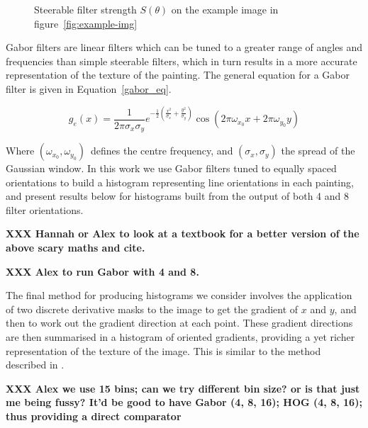 \documentclass[conference,a4paper]{IEEEtran}
\begin{document}
\begin{figure}[h]
\centering

\caption{Steerable filter strength $S(\theta)$ on the example image in figure~\ref{fig:example-img}}
\end{figure}

Gabor filters are linear filters which can be tuned to a greater range of
angles and frequencies than simple steerable filters, which in turn results in
a more accurate representation of the texture of the painting. The general
equation for a Gabor filter is given in Equation~\ref{gabor_eq}.

\begin{equation}
g_e(x) = \frac{1}{2\pi\sigma_x \sigma_y}e^{-\frac{1}{2}\left(\frac{x^2}{\sigma_x}+\frac{y^2}{\sigma_y}\right)}\cos(2\pi\omega_{x_0}x + 2\pi\omega_{y_0}y)
\label{gabor_eq}
\end{equation}

Where $(\omega_{x_0},\omega_{y_0})$\ defines the centre frequency, and
$(\sigma_x,\sigma_y)$ the spread of the Gaussian window. In this work we use
Gabor filters tuned to equally spaced orientations to build a histogram
representing line orientations in each painting, and present results below for
histograms built from the output of both 4 and 8 filter orientations.

\textbf{XXX Hannah or Alex to look at a textbook for a better version of the above scary maths and cite.}

\textbf{XXX Alex to run Gabor with 4 and 8.}

The final method for producing histograms we consider involves the application
of two discrete derivative masks to the image to get the gradient of $x$ and
$y$, and then to work out the gradient direction at each point. These gradient
directions are then summarised in a histogram of oriented gradients, providing
a yet richer representation of the texture of the image. This is similar to the
method described in \cite{Dalal2005Histograms}. 

\textbf{XXX Alex we use 15 bins; can we try different bin size? or is that just
me being fussy? It'd be good to have Gabor (4, 8, 16); HOG (4, 8, 16); thus
providing a direct comparator}


\end{document}
